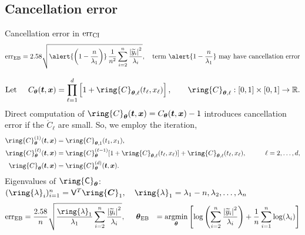 \documentclass[handout, 10pt,compress,xcolor={usenames,dvipsnames}]{beamer} %
\newcommand{\bm}[1]{\boldsymbol{#1}}
\newcommand{\MLE}{\textup{EB}}
\newcommand{\CI}{\textup{CI}}
\newcommand{\vC}{\bvec{C}}
\newcommand{\rmC}{\ring{\mC}}
\newcommand{\err}{{\text{err}}}
\newcommand{\rlambda}{\ring{\lambda}}
\newcommand{\rC}{\ring{C}}
\newcommand{\rvC}{\ring{\vC}}
\renewcommand{\ty}{\widetilde{y}}
\renewcommand{\vtheta}{{\bm{\theta}}}
\newcommand{\pause}{}
\def\abs#1{\ensuremath{\left \lvert #1 \right \rvert}}
\begin{document}
\subsection{Cancellation error}

\begin{frame}{Cancellation error in $\err_\CI$}
	\vspace{-7.5ex}
	\begin{align*}
	\err_\MLE =
	2.58\sqrt{\alert{\left( 1 - \frac{n}{\lambda_1} \right)} \,
		\frac {1}{n^2} \sum_{i=2}^{n} \frac{\abs{\ty_i}^2}{\lambda_i}  }
	,
	\quad \text{term $\alert{ 1 - \frac{n}{\lambda_1} }$ may have cancellation error}
	\end{align*}
	\pause
	\vspace{-2ex}
	\begin{align*}
	\text{Let} \hspace{0.5cm} C_{\vtheta}(\vt, \vx) = \prod_{\ell=1}^d \left[1 + \rC_{\vtheta,\ell}(t_\ell,x_\ell) \right], \qquad  \rC_{\vtheta,\ell}:[0,1] \times [0,1] \to \reals.
	\end{align*}
	Direct computation of $\rC_{\vtheta} (\vt,\vx) = C_{\vtheta}(\vt,\vx) -1$ introduces cancellation error if the $ \rC_\ell$ are small.  So, we employ the iteration,
	\begin{align*}
	\rC_{\vtheta}^{(1)}(\vt,\vx) &= \rC_{\vtheta,1}(t_1,x_1),  \\
	\rC_{\vtheta}^{(\ell)}(\vt,\vx) &  = \rC_{\vtheta}^{(\ell-1)}[1 + \rC_{\vtheta,\ell}(t_\ell,x_\ell)] + \rC_{\vtheta,\ell}(t_\ell,x_\ell),  \hspace{1cm} \ell = 2, \ldots, d, \\
	\rC_{\vtheta}(\vt,\vx)  & = \rC_{\vtheta}^{(d)}(\vt,\vx).
	\end{align*}
	Eigenvalues of $\rmC_{\vtheta}$:  
	$(\rlambda_i)_{i=1}^n = \mV^T \rvC_1, \quad \rlambda_1 = \lambda_1 - n, \lambda_2, \ldots, \lambda_n$
	\begin{align*}
	\err_\MLE  &
	=
	\frac{2.58}{n}\sqrt{
		\frac{\rlambda_1}{\lambda_1}
		\sum_{i=2}^{n} \frac{\abs{\ty_i}^2}{\lambda_i}  
	}, 
	\hspace{0.5cm}
	\vtheta_\MLE
	&= 
	\argmin_{\vtheta}
	\left[
	\log\left(
	\sum_{i=2}^n \frac{\abs{\ty_i}^2}{\lambda_i}
	\right) 
	+ 
	\frac{1}{n}\sum_{i=1}^n \log(\lambda_i)
	\right]
	\end{align*}
	
\end{frame}
\end{document}
